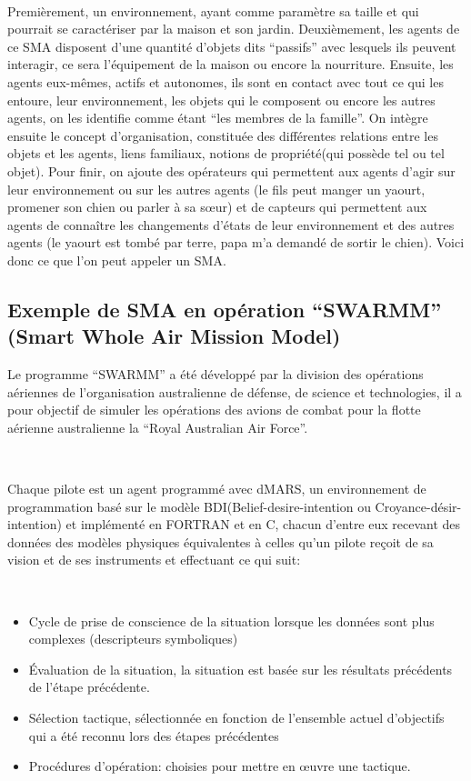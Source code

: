 ~\par
Premièrement, un environnement, ayant comme paramètre sa taille et qui pourrait se caractériser par la maison et son jardin. Deuxièmement, les agents de ce SMA disposent d’une quantité d’objets dits “passifs” avec lesquels ils peuvent interagir, ce sera l’équipement de la maison ou encore la nourriture. Ensuite, les agents eux-mêmes, actifs et autonomes, ils sont en contact avec tout ce qui les entoure, leur environnement, les objets qui le composent ou encore les autres agents, on les identifie comme étant “les membres de la famille”. On intègre ensuite le concept d’organisation, constituée des différentes relations entre les objets et les agents, liens familiaux, notions de propriété(qui possède tel ou tel objet). Pour finir, on ajoute des opérateurs qui permettent aux agents d’agir sur leur environnement ou sur les autres agents (le fils peut manger un yaourt, promener son chien ou parler à sa sœur) et de capteurs qui permettent aux agents de connaître les changements d'états de leur environnement et des autres agents (le yaourt est tombé par terre, papa m'a demandé de sortir le chien). Voici donc ce que l'on peut appeler un SMA. \parencite{sma}


\subsection{Exemple de SMA en opération “SWARMM” (Smart Whole Air Mission Model)} \label{ssec:swarm}

Le  programme “SWARMM” a été développé par la division des opérations aériennes de l’organisation australienne de défense, de science et technologies, il a  pour objectif de simuler les opérations des avions de combat pour la flotte aérienne australienne la “Royal Australian Air Force”.

~\par
Chaque pilote est un agent programmé avec dMARS, un environnement de programmation basé sur le modèle BDI(Belief-desire-intention ou Croyance-désir-intention) et implémenté en FORTRAN et en C, chacun d'entre eux recevant des données des modèles physiques équivalentes à celles qu'un pilote reçoit de sa vision et de ses instruments et effectuant ce qui suit:

~\par
\begin{itemize}
\item Cycle de prise de conscience de la situation lorsque les données sont plus complexes (descripteurs symboliques)
\item  Évaluation de la situation, la situation est basée sur les résultats précédents de l'étape précédente.
\item Sélection tactique, sélectionnée en fonction de l'ensemble actuel d'objectifs qui a été reconnu lors des étapes précédentes
\item Procédures d'opération: choisies pour mettre en œuvre une tactique.
\end{itemize}

